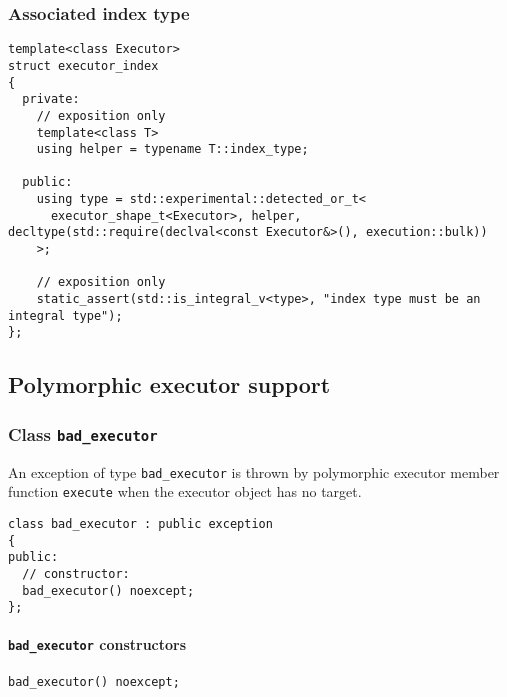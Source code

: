 \documentclass[a4paper,12pt,notitlepage,twoside,openright]{article}
\begin{document}
\hypertarget{associated-index-type}{%
\subsubsection{Associated index type}\label{associated-index-type}}

\begin{verbatim}
template<class Executor>
struct executor_index
{
  private:
    // exposition only
    template<class T>
    using helper = typename T::index_type;

  public:
    using type = std::experimental::detected_or_t<
      executor_shape_t<Executor>, helper, decltype(std::require(declval<const Executor&>(), execution::bulk))
    >;

    // exposition only
    static_assert(std::is_integral_v<type>, "index type must be an integral type");
};
\end{verbatim}

\hypertarget{polymorphic-executor-support}{%
\subsection{Polymorphic executor
support}\label{polymorphic-executor-support}}

\hypertarget{class-bad_executor}{%
\subsubsection{\texorpdfstring{Class
\texttt{bad_executor}}{Class }}\label{class-bad_executor}}

An exception of type \texttt{bad_executor} is thrown by
polymorphic executor member function \texttt{execute} when
the executor object has no target.

\begin{verbatim}
class bad_executor : public exception
{
public:
  // constructor:
  bad_executor() noexcept;
};
\end{verbatim}

\hypertarget{bad_executor-constructors}{%
\paragraph{\texorpdfstring{\texttt{bad_executor}
constructors}{ constructors}}\label{bad_executor-constructors}}

\begin{verbatim}
bad_executor() noexcept;
\end{verbatim}
\end{document}
